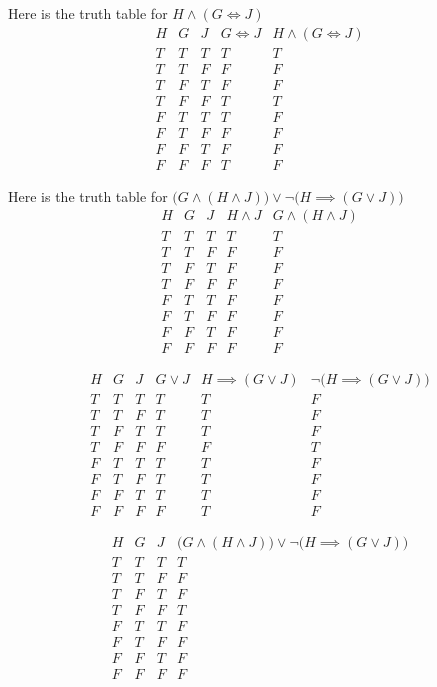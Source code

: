 \begin{solution}
    Here is the truth table for $H \wedge (G \iff J)$
    \[
    \begin{array}{c|c|c|c|c}
    H & G & J & G \iff J & H \wedge (G \iff J) \\
    \hline
    T & T & T & T & T\\
    T & T & F & F &  F\\
    T & F & T & F & F \\
    T & F & F & T & T \\
    F & T & T & T & F \\
    F & T & F & F & F \\
    F & F & T & F & F \\
    F & F & F & T & F
    \end{array}
    \]

    Here is the truth table for $\bigl(G \land (H \land J)\bigr)
    \lor
    \neg\bigl(H \implies (G \lor J)\bigr)$
    \[
    \begin{array}{c|c|c|c|c}
    H & G & J & H \wedge J & G \wedge (H \wedge J) \\
    \hline
    T & T & T & T & T\\
    T & T & F & F & F\\
    T & F & T & F & F\\
    T & F & F & F & F\\
    F & T & T & F & F\\
    F & T & F & F & F\\
    F & F & T & F & F\\
    F & F & F & F & F
    \end{array}
    \]

    \[
    \begin{array}{c|c|c|c|c|c}
    H & G & J & G \vee J
    & H \implies (G \vee J)
    & \neg\bigl(H \implies (G \vee J)\bigr) \\
    \hline
    T & T & T & T & T & F \\
    T & T & F & T & T & F \\
    T & F & T & T & T & F \\
    T & F & F & F & F & T \\
    F & T & T & T & T & F \\
    F & T & F & T & T & F \\
    F & F & T & T & T & F \\
    F & F & F & F & T & F
    \end{array}
    \]

    \[
    \begin{array}{c|c|c|c}
    H & G & J &
    \bigl(G \land (H \land J)\bigr)
    \lor
    \neg\bigl(H \implies (G \lor J)\bigr)
    \\
    \hline
    T & T & T & T\\
    T & T & F & F\\
    T & F & T & F\\
    T & F & F & T\\
    F & T & T & F\\
    F & T & F & F\\
    F & F & T & F\\
    F & F & F & F
    \end{array}
    \]


\end{solution}
